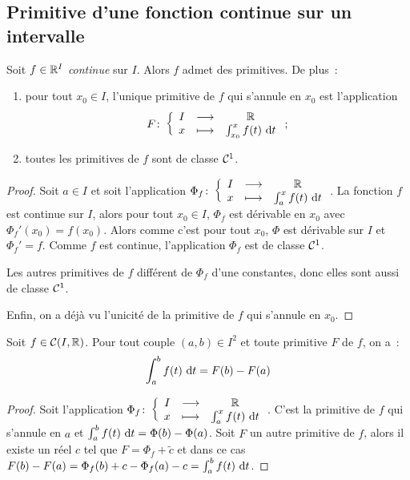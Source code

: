 \subsection{Primitive d'une fonction continue sur un intervalle}

\begin{theo}
  Soit \(f \in \mathbb{R}^I\) \emph{continue} sur \(I\). Alors \(f\) admet des
  primitives. De plus~:
  \begin{enumerate}
    \item pour tout \(x_0 \in I\), l'unique primitive de \(f\) qui s'annule en
      \(x_0\) est l'application
      \begin{equation}
        F\colon\left\{\begin{array}{ccc}I & \longrightarrow &\mathbb{R}\\x & \longmapsto & \int_{x_0}^x f(t)\,\mathop{}\mathopen{}\mathrm{d} t\end{array}\right.;
      \end{equation}
    \item toutes les primitives de \(f\) sont de classe \(\mathcal{C}^{1}\).
  \end{enumerate}
\end{theo}
\begin{proof}
  Soit \(a \in I\) et soit l'application
  \(\Phi_f\colon\left\{\begin{array}{ccc}I & \longrightarrow &\mathbb{R}\\x & \longmapsto & \int_a^xf(t)\,\mathop{}\mathopen{}\mathrm{d} t\end{array}\right.\). La fonction \(f\) est
  continue sur \(I\), alors pour tout \(x_0 \in I\), \(\Phi_f\) est dérivable en
  \(x_0\) avec \(\Phi_f'(x_0) = f(x_0)\). Alors comme c'est pour tout \(x_0\),
  \(\Phi\) est dérivable sur \(I\) et \(\Phi_f' = f\). Comme \(f\) est continue,
  l'application \(\Phi_f\) est de classe \(\mathcal{C}^{1}\).

  Les autres primitives de \(f\) différent de \(\Phi_f\) d'une constantes, donc
  elles sont aussi de classe \(\mathcal{C}^{1}\).

  Enfin, on a déjà vu l'unicité de la primitive de \(f\) qui s'annule en
  \(x_0\).
\end{proof}

\begin{prop}
  Soit \(f \in \mathcal{C}(I,\mathbb{R})\). Pour tout couple \((a,b) \in I^2\) et toute
  primitive \(F\) de \(f\), on a~:
  \begin{equation}
    \int_a^b f(t)\,\mathop{}\mathopen{}\mathrm{d} t = F(b)-F(a)
  \end{equation}
\end{prop}
\begin{proof}
  Soit l'application \(\Phi_f\colon\left\{\begin{array}{ccc}I & \longrightarrow &\mathbb{R}\\x & \longmapsto & \int_a^xf(t)\,\mathop{}\mathopen{}\mathrm{d} t\end{array}\right.\).
  C'est la primitive de \(f\) qui s'annule en \(a\) et \(\int_a^b f(t)\,\mathop{}\mathopen{}\mathrm{d}
  t = \Phi(b)-\Phi(a)\). Soit \(F\) un autre primitive de \(f\), alors il existe
  un réel \(c\) tel que \(F = \Phi_f +\tilde{c}\) et dans ce cas
  \(F(b)-F(a) = \Phi_f(b)+c - \Phi_f(a)-c = \int_a^bf(t)\,\mathop{}\mathopen{}\mathrm{d} t\).
\end{proof}

